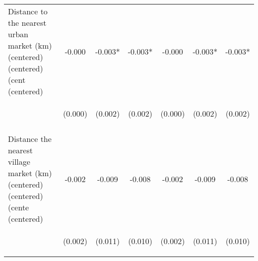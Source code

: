 \begin{center}
\begin{tabular}{lcccccc}
Distance to the nearest urban market (km) (centered) (centered) (cent (centered) & -0.000 & -0.003* & -0.003* & -0.000 & -0.003* & -0.003* \\
 & \begin{footnotesize}(0.000)\end{footnotesize} & \begin{footnotesize}(0.002)\end{footnotesize} & \begin{footnotesize}(0.002)\end{footnotesize} & \begin{footnotesize}(0.000)\end{footnotesize} & \begin{footnotesize}(0.002)\end{footnotesize} & \begin{footnotesize}(0.002)\end{footnotesize} \\
\vspace{4pt} & \begin{footnotesize}[0.146]\end{footnotesize} & \begin{footnotesize}[0.087]\end{footnotesize} & \begin{footnotesize}[0.084]\end{footnotesize} & \begin{footnotesize}[0.146]\end{footnotesize} & \begin{footnotesize}[0.087]\end{footnotesize} & \begin{footnotesize}[0.084]\end{footnotesize} \\
Distance the nearest village market (km) (centered) (centered) (cente (centered) & -0.002 & -0.009 & -0.008 & -0.002 & -0.009 & -0.008 \\
 & \begin{footnotesize}(0.002)\end{footnotesize} & \begin{footnotesize}(0.011)\end{footnotesize} & \begin{footnotesize}(0.010)\end{footnotesize} & \begin{footnotesize}(0.002)\end{footnotesize} & \begin{footnotesize}(0.011)\end{footnotesize} & \begin{footnotesize}(0.010)\end{footnotesize} \\

\end{tabular}
\end{center}
